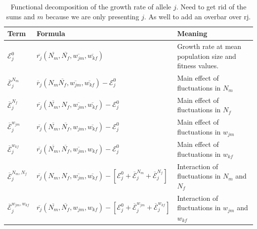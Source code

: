\documentclass[]{article}
\begin{document}
\begin{table}[h]
\fontsize{7}{12}\selectfont %
    \centering
      \caption{Functional decomposition of the growth rate of allele $j$. Need to get rid of the sums and $m$ because we are only presenting $j$. As well to add an overbar over rj. }
  \resizebox{\textwidth}{!} {\begin{tabular}{l|l|l}
  \toprule
        Term & Formula & Meaning \\
        \hline
         $\mathcal{E}^{0}_{j}$ & $\overline{r_{j}} (\overline{N_{m}}, \overline{N_{f}}, \overline{w_{jm}}, \overline{w_{kf}})$ & Growth rate at mean population size and fitness values. \\


         $\overline{\mathcal{E}}^{N_{m}}_{j}$ & $\overline{r}_{j}(N_{m} \overline{N_{f}}, \overline{w_{jm}}, \overline{w_{kf}}) - \mathcal{E}^{0}_{j} $ & Main effect of fluctuations in $N_{m}$\\

         $\overline{\mathcal{E}}^{N_{f}}_{j}$ & $ \overline{r_{j}}( \overline{N_{m}}, N_{f},\overline{w_{jm}}, \overline{w_{kf}}) - \mathcal{E}^{0}_{j}$ & Main effect of fluctuations in $N_{f}$ \\

        $\overline{\mathcal{E}}^{w_{jm}}_{j}$ & $ \overline{r_{j}}(\overline{N_{m}}, \overline{N_{f}}, w_{jm}, \overline{w_{kf}}) - \mathcal{E}^{0}_{j}$& Main effect of fluctuations in $w_{jm}$\\

        $\overline{\mathcal{E}}^{w_{kf}}_{j}$ & $ \overline{r_{j}}(\overline{N_{m}}, \overline{N_{f}}, \overline{w_{jm}}, w_{kf})- \mathcal{E}^{0}_{j}$ & Main effect of fluctuations in $w_{kf}$\\

        $\overline{\mathcal{E}}^{N_{m},N_{f}}_{j}$ & $ \overline{r_{j}}(N_{m}, N_{f}, \overline{w_{jm}}, \overline{w_{kf}})- [\mathcal{E}^{0}_{j} +\overline{\mathcal{E}}^{N_{m}}_{j}+\overline{\mathcal{E}}^{N_{f}}_{j}]$ & Interaction of fluctuations in $N_{m}$ and $N_{f}$\\

        $\overline{\mathcal{E}}^{w_{jm},w_{kf}}_{j}$ & $ \overline{r_{j}}(\overline{N_{m}}, \overline{N_{f}}, w_{jm}, w_{kf})- [\mathcal{E}^{0}_{j} +\overline{\mathcal{E}}^{w_{jm}}_j+\overline{\mathcal{E}}^{w_{kf}}_{j}]$ & Interaction of fluctuations in $w_{jm}$ and $w_{kf}$ \\


\end{tabular}}
\end{table}
\end{document}
